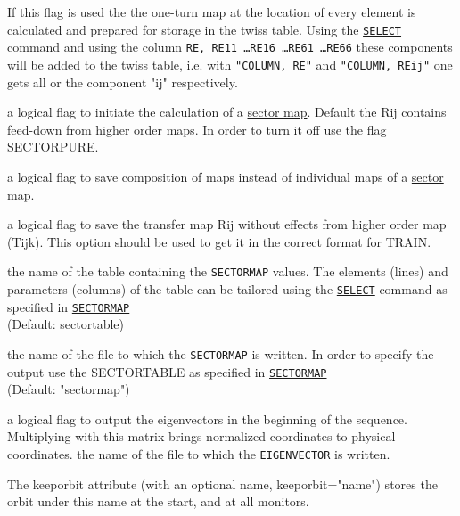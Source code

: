 \begin{madlist}
   If this flag is used the the one-turn map at the
  location of every element is calculated and prepared for
  storage in the twiss table. Using the
  \hyperref[sec:select]{\texttt{SELECT}} command and using
  the column \texttt{RE, RE11 \ldots RE16 \ldots RE61 \ldots RE66} these
  components will be added to the twiss table, i.e. with \texttt{"COLUMN, RE"} and
  \texttt{"COLUMN, REij"} one gets all or the component "ij" respectively.    

   a logical flag to initiate the calculation of a 
  \hyperref[sec:sectormap]{sector map}. Default the Rij contains feed-down from higher order maps. In order to turn it off use the flag SECTORPURE. 
  
   a logical flag to save composition of maps instead of individual maps of a
  \hyperref[sec:sectormap]{sector map}.

   a logical flag to save the transfer map Rij without effects from higher order map (Tijk). This option should be used to get it in the correct format for TRAIN.

   the name of the table containing the \texttt{SECTORMAP}
  values. The elements (lines) and parameters (columns) 
  of the table can be tailored using the \hyperref[sec:select]{\texttt{SELECT}} 
  command as specified in \hyperref[sec:sectormap]{\texttt{SECTORMAP}} \\
  (Default: sectortable)

   the name of the file to which the \texttt{SECTORMAP} is
  written. 
  In order to specify the output use the SECTORTABLE as specified in
  \hyperref[sec:sectormap]{\texttt{SECTORMAP}} \\
  (Default: "sectormap")

   a logical flag to output the eigenvectors in the beginning of the sequence. Multiplying with this matrix brings normalized coordinates to physical coordinates.
   the name of the file to which the \texttt{EIGENVECTOR} is written. 

   The keeporbit attribute (with an optional name,
  keeporbit="name") stores the orbit under this name at the
  start, and at all monitors.    


\end{madlist}
